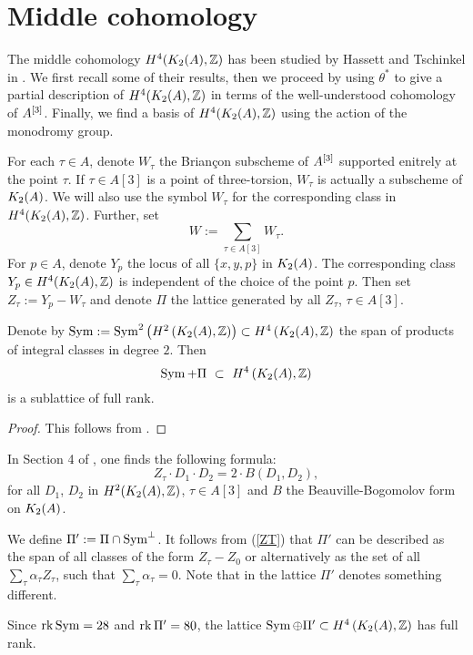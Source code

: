 
 \section{Middle cohomology}\label{Middle}
The middle cohomology $H^4(K_{ 2 }( A ),\mathbb{Z})$ has been studied by Hassett and Tschinkel in \cite{Hassett}. We first recall some of their results,
then we proceed by using $\theta^*$ to give a partial description of $H^4(K_{ 2 }( A ),\mathbb{Z})$ in terms of the well-understood cohomology of $A^{[3]}$. 
Finally, we find a basis of $H^4(K_{ 2 }( A ),\mathbb{Z})$ using the action of the monodromy group.
\begin{notation}
For each $\tau \in A$, denote $W_\tau$ the Brian\c con subscheme of $A^{[3]}$ supported enitrely at the point $\tau$. If $\tau\in A[3]$ is a point of three-torsion, $W_\tau$ is actually a subscheme of $K_{ 2 }( A )$. We will also use the symbol $W_\tau$ for the corresponding class in $H^4(K_{ 2 }( A ),\mathbb{Z})$. Further, set 
$$
W := \sum_{\tau\in A[3]} W_\tau.
$$
For $p\in A$, denote $Y_p$ the locus of all $\{x,y,p\}$ in $K_{ 2 }( A )$. The corresponding class $Y_p \in H^4(K_{ 2 }( A ),\mathbb{Z})$ is independent of the choice of the point $p$. Then set $Z_\tau := Y_p - W_\tau$ and denote $\Pi$ the lattice generated by all $Z_\tau$, $\tau \in A[3]$.
\end{notation}
\begin{proposition}
Denote by $\operatorname{Sym} := \operatorname{Sym}^2\left(H^2\left(K_{ 2 }( A ),\mathbb{Z}\right)\right) \subset H^4\left(K_{ 2 }( A ),\mathbb{Z}\right) $ the span of products of integral classes in degree $2$.
Then 
$$
\Sym+\Pi \ \subset\  H^4\left(\X,\Z\right)
$$
is a sublattice  of full rank.  
\end{proposition}
\begin{proof}
This follows from \cite[Proposition 4.3]{Hassett}.
\end{proof}

In Section 4 of \cite{Hassett}, one finds the following formula:
\begin{equation}
Z_{\tau}\cdot D_{1}\cdot D_{2}=2\cdot B(D_{1},D_{2}),
\label{ZT}
\end{equation}
for all $D_{1}$, $D_{2}$ in $H^{2}(K_{ 2 }( A ),\mathbb{Z})$, $\tau\in A[3]$ and $B$ the Beauville-Bogomolov form on $K_{ 2 }( A )$.

\begin{definition}\label{defiPi}
We define $\Pi' := \Pi \cap \operatorname{Sym}^{\perp}$. It follows from (\ref{ZT}) that $\Pi'$ can be described as the span of all classes of the form $Z_\tau -Z_0$ or alternatively as the set of all
$
\sum_\tau \alpha_\tau Z_\tau $, such that $ \sum_\tau \alpha_\tau =0$.
Note that in \cite{Hassett} the lattice $\Pi'$ denotes something different.
\end{definition}
\begin{remark}
Since $\operatorname{rk} \operatorname{Sym} = 28$ and $\operatorname{rk} \Pi' = 80$, the lattice $\operatorname{Sym}\oplus\Pi'\subset H^4\left(K_{ 2 }( A ),\mathbb{Z}\right)$ has full rank.
\end{remark}

